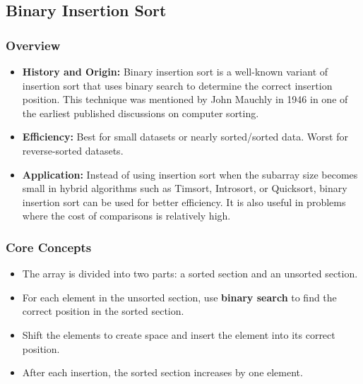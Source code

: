 \subsection[Binary Insertion Sort]{Binary Insertion Sort\cite{gfg_binaryinsertionsort}}
    \subsubsection{Overview}
        \begin{itemize}
            \item \textbf{History and Origin:} Binary insertion sort is a well-known variant of insertion sort that uses binary search to determine the correct insertion position. This technique was mentioned by John Mauchly in 1946 in one of the earliest published discussions on computer sorting\cite[p.~82]{knuth1998sorting}.
            \item \textbf{Efficiency:} Best for small datasets or nearly sorted/sorted data. Worst for reverse-sorted datasets.
            \item \textbf{Application:} Instead of using insertion sort when the subarray size becomes small in hybrid algorithms such as Timsort, Introsort, or Quicksort, binary insertion sort can be used for better efficiency. It is also useful in problems where the cost of comparisons is relatively high.
        \end{itemize}
    \subsubsection{Core Concepts}
        \begin{itemize}
            \item The array is divided into two parts: a sorted section and an unsorted section.
            \item For each element in the unsorted section, use \textbf{binary search\cite{gfg_binarysearch}} to find the correct position in the sorted section.
            \item Shift the elements to create space and insert the element into its correct position.
            \item After each insertion, the sorted section increases by one element.
        \end{itemize}

